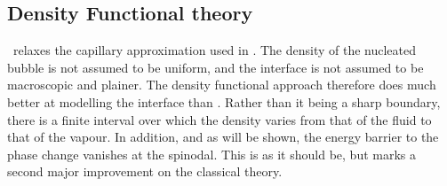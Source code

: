 \subsection{Density Functional theory}\label{sec:nuc:DFT}




\Dft\ relaxes the capillary approximation used in \cnt.
The density of the nucleated bubble is not assumed to be uniform,
and the interface is not assumed to be macroscopic and plainer\cite{Oxtoby1992, Oxtoby1988}.
The density functional approach therefore does much better at modelling the interface than \cnt.
Rather than it being a sharp boundary,
there is a finite interval over which the density varies from that of the fluid to that of the vapour.
In addition, and as will be shown, the energy barrier to the phase change vanishes at the spinodal.
This is as it should be, but marks a second major improvement on the classical theory\cite{Talanquer1994}.





